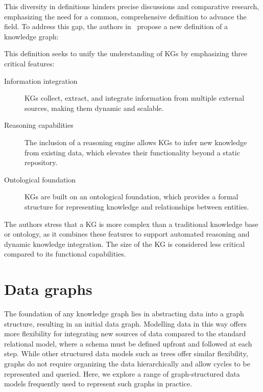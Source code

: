 This diversity in definitions hinders precise discussions and comparative research, emphasizing the need for a common, comprehensive definition to advance the field. To address this gap, the authors in~\cite{Ehrlinger2016TowardsAD} propose a new definition of a knowledge graph: 
\begin{center}
    \begin{quote}
    \end{quote}
\end{center}
This definition seeks to unify the understanding of KGs by emphasizing three critical features:
\begin{description}
    \item[Information integration] KGs collect, extract, and integrate information from multiple external sources, making them dynamic and scalable.
    \item[Reasoning capabilities] The inclusion of a reasoning engine allows KGs to infer new knowledge from existing data, which elevates their functionality beyond a static repository.
    \item[Ontological foundation] KGs are built on an ontological foundation, which provides a formal structure for representing knowledge and relationships between entities. 
\end{description}

The authors stress that a KG is more complex than a traditional knowledge base or ontology, as it combines these features to support automated reasoning and dynamic knowledge integration. The size of the KG is considered less critical compared to its functional capabilities.

\section{Data graphs}\label{data-graphs}
The foundation of any knowledge graph lies in abstracting data into a graph structure, resulting in an initial data graph. Modelling data in this way offers more flexibility for integrating new sources of data compared to the standard relational model, where a schema must be defined upfront and followed at each step. While other structured data models such as trees offer similar flexibility, graphs do not require organizing the data hierarchically and allow cycles to be represented and queried. Here, we explore a range of graph-structured data models frequently used to represent such graphs in practice.~\cite{Hogan2021KGs}

